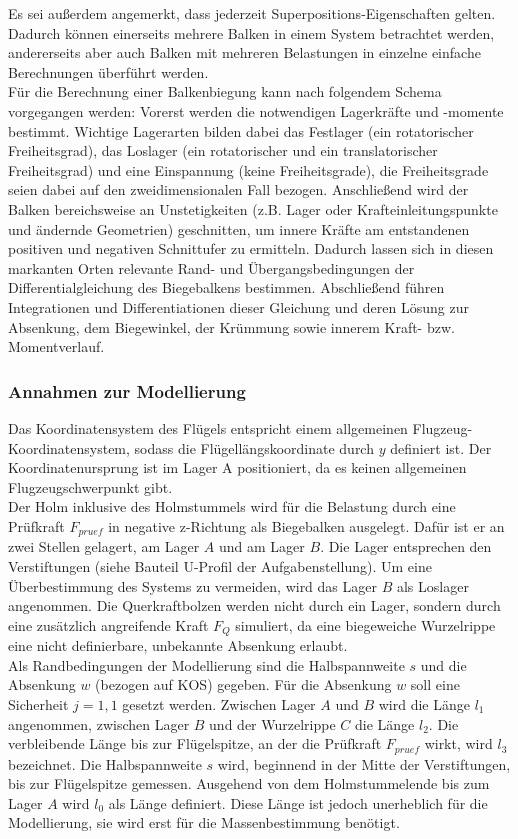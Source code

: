 \noindent Es sei außerdem angemerkt, dass jederzeit Superpositions-Eigenschaften gelten. Dadurch können einerseits mehrere Balken in einem System betrachtet werden, andererseits aber auch Balken mit mehreren Belastungen in einzelne einfache Berechnungen überführt werden.\\

\noindent Für die Berechnung einer Balkenbiegung kann nach folgendem Schema vorgegangen werden: Vorerst werden die notwendigen Lagerkräfte und -momente bestimmt. Wichtige Lagerarten bilden dabei das Festlager (ein rotatorischer Freiheitsgrad), das Loslager (ein rotatorischer und ein translatorischer Freiheitsgrad) und eine Einspannung (keine Freiheitsgrade), die Freiheitsgrade seien dabei auf den zweidimensionalen Fall bezogen. Anschließend wird der Balken bereichsweise an  Unstetigkeiten (z.B. Lager oder Krafteinleitungspunkte und ändernde Geometrien) geschnitten, um innere Kräfte am entstandenen positiven und negativen Schnittufer zu ermitteln. Dadurch lassen sich in diesen markanten Orten relevante Rand- und Übergangsbedingungen der Differentialgleichung des Biegebalkens bestimmen. Abschließend führen Integrationen und Differentiationen dieser Gleichung und deren Lösung  zur Absenkung, dem Biegewinkel, der Krümmung sowie innerem Kraft- bzw. Momentverlauf.


\subsubsection{Annahmen zur Modellierung}
Das Koordinatensystem des Flügels entspricht einem allgemeinen Flugzeug-Koordinatensystem, sodass die Flügellängskoordinate durch $y$ definiert ist. Der Koordinatenursprung ist im Lager A positioniert, da es keinen allgemeinen Flugzeugschwerpunkt gibt. \\

\noindent Der Holm inklusive des Holmstummels wird für die Belastung durch eine Prüfkraft $F_{pruef}$ in negative z-Richtung als Biegebalken ausgelegt. Dafür ist er an zwei Stellen gelagert, am Lager $A$ und am Lager $B$. Die Lager entsprechen den Verstiftungen (siehe Bauteil U-Profil der Aufgabenstellung). Um eine Überbestimmung des Systems zu vermeiden, wird das Lager $B$ als Loslager angenommen. Die Querkraftbolzen werden nicht durch ein Lager, sondern durch eine zusätzlich angreifende Kraft $F_{Q}$ simuliert, da eine biegeweiche Wurzelrippe eine nicht definierbare, unbekannte Absenkung erlaubt.\\

\noindent Als Randbedingungen der Modellierung sind die Halbspannweite $s$ und die Absenkung $w$ (bezogen auf KOS) gegeben. Für die Absenkung $w$ soll eine Sicherheit $j=1,1$ gesetzt werden. Zwischen Lager $A$ und $B$ wird die Länge $l_{1}$ angenommen, zwischen Lager $B$ und der Wurzelrippe $C$ die Länge $l_{2}$. Die verbleibende Länge bis zur Flügelspitze, an der die Prüfkraft $F_{pruef}$ wirkt, wird $l_{3}$ bezeichnet. Die Halbspannweite $s$ wird, beginnend in der Mitte der Verstiftungen, bis zur Flügelspitze gemessen. Ausgehend von dem Holmstummelende bis zum Lager $A$ wird $l_{0}$ als Länge definiert. Diese Länge ist jedoch unerheblich für die Modellierung, sie wird erst für die Massenbestimmung benötigt.\\

